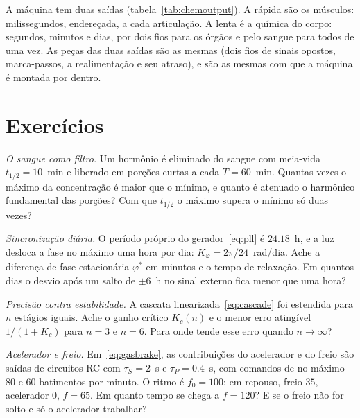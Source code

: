 A máquina tem duas saídas (tabela~\ref{tab:chemoutput}). A rápida são os músculos: milissegundos, endereçada, a cada articulação. A lenta é a química do corpo: segundos, minutos e dias, por dois fios para os órgãos e pelo sangue para todos de uma vez. As peças das duas saídas são as mesmas (dois fios de sinais opostos, marca-passos, a realimentação e seu atraso), e são as mesmas com que a máquina é montada por dentro.

\section{Exercícios}

\begin{exercise}[\lvlA]
\label{ex:16:1}
\emph{O sangue como filtro.} Um hormônio é eliminado do sangue com meia-vida $t_{1/2}=10$~min e liberado em porções curtas a cada $T=60$~min. Quantas vezes o máximo da concentração é maior que o mínimo, e quanto é atenuado o harmônico fundamental das porções? Com que $t_{1/2}$ o máximo supera o mínimo só duas vezes?
\end{exercise}

\begin{exercise}[\lvlA]
\label{ex:16:2}
\emph{Sincronização diária.} O período próprio do gerador~\eqref{eq:pll} é $24.18$~h, e a luz desloca a fase no máximo uma hora por dia: $K_\varphi=2\pi/24$~rad/dia. Ache a diferença de fase estacionária $\varphi^*$ em minutos e o tempo de relaxação. Em quantos dias o desvio após um salto de $\pm6$~h no sinal externo fica menor que uma hora?
\end{exercise}

\begin{exercise}[\lvlB]
\label{ex:16:3}
\emph{Precisão contra estabilidade.} A cascata linearizada~\eqref{eq:cascade} foi estendida para $n$ estágios iguais. Ache o ganho crítico $K_c(n)$ e o menor erro atingível $1/(1+K_c)$ para $n=3$ e $n=6$. Para onde tende esse erro quando $n\to\infty$?
\end{exercise}

\begin{exercise}[\lvlB]
\label{ex:16:4}
\emph{Acelerador e freio.} Em~\eqref{eq:gasbrake}, as contribuições do acelerador e do freio são saídas de circuitos RC com $\tau_S=2$~s e $\tau_P=0.4$~s, com comandos de no máximo $80$ e $60$ batimentos por minuto. O ritmo é $f_0=100$; em repouso, freio $35$, acelerador $0$, $f=65$. Em quanto tempo se chega a $f=120$? E se o freio não for solto e só o acelerador trabalhar?
\end{exercise}

